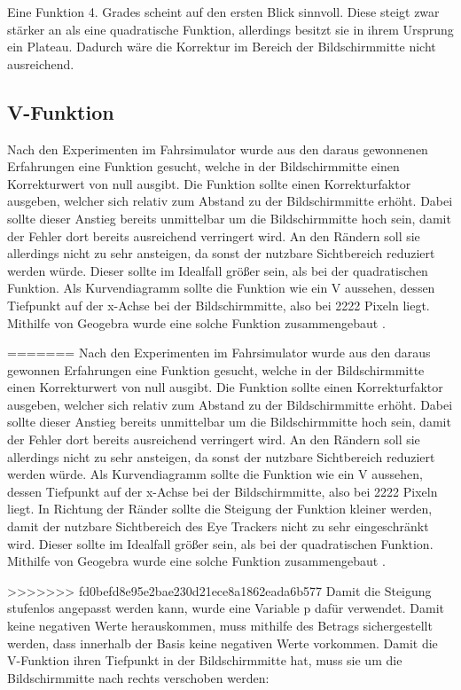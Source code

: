 Eine Funktion 4. Grades scheint auf den ersten Blick sinnvoll. Diese steigt zwar stärker an als eine quadratische Funktion, allerdings besitzt sie in ihrem Ursprung ein Plateau. Dadurch wäre die Korrektur im Bereich der Bildschirmmitte nicht ausreichend. 


\subsection{V-Funktion}

Nach den Experimenten im Fahrsimulator wurde aus den daraus gewonnenen Erfahrungen eine Funktion gesucht, welche in der Bildschirmmitte einen Korrekturwert von null ausgibt. Die Funktion sollte einen Korrekturfaktor ausgeben, welcher sich relativ zum Abstand zu der Bildschirmmitte erhöht. Dabei sollte dieser Anstieg bereits unmittelbar um die Bildschirmmitte hoch sein, damit der Fehler dort bereits ausreichend verringert wird. An den Rändern soll sie allerdings nicht zu sehr ansteigen, da sonst der nutzbare Sichtbereich reduziert werden würde. Dieser sollte im Idealfall größer sein, als bei der quadratischen Funktion. Als Kurvendiagramm sollte die Funktion wie ein V aussehen, dessen Tiefpunkt auf der x-Achse bei der Bildschirmmitte, also bei 2222 Pixeln liegt. Mithilfe von Geogebra wurde eine solche Funktion zusammengebaut \cite{lit_software_geogebra}.

=======
Nach den Experimenten im Fahrsimulator wurde aus den daraus gewonnen Erfahrungen eine Funktion gesucht, welche in der Bildschirmmitte einen Korrekturwert von null ausgibt. Die Funktion sollte einen Korrekturfaktor ausgeben, welcher sich relativ zum Abstand zu der Bildschirmmitte erhöht. Dabei sollte dieser Anstieg bereits unmittelbar um die Bildschirmmitte hoch sein, damit der Fehler dort bereits ausreichend verringert wird. An den Rändern soll sie allerdings nicht zu sehr ansteigen, da sonst der nutzbare Sichtbereich reduziert werden würde. Als Kurvendiagramm sollte die Funktion wie ein V aussehen, dessen Tiefpunkt auf der x-Achse bei der Bildschirmmitte, also bei 2222 Pixeln liegt. In Richtung der Ränder sollte die Steigung der Funktion kleiner werden, damit der nutzbare Sichtbereich des Eye Trackers nicht zu sehr eingeschränkt wird. Dieser sollte im Idealfall größer sein, als bei der quadratischen Funktion. Mithilfe von Geogebra wurde eine solche Funktion zusammengebaut \cite{lit_software_geogebra}.

>>>>>>> fd0befd8e95e2bae230d21ece8a1862eada6b577
Damit die Steigung stufenlos angepasst werden kann, wurde eine Variable p dafür verwendet. Damit keine negativen Werte herauskommen, muss mithilfe des Betrags sichergestellt werden, dass innerhalb der Basis keine negativen Werte vorkommen. Damit die \Gls{V-Funktion} ihren Tiefpunkt in der Bildschirmmitte hat, muss sie um die Bildschirmmitte nach rechts verschoben werden:

